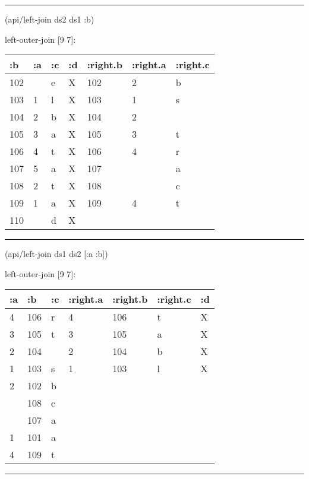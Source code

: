 \documentclass[]{article}
\newenvironment{Shaded}{\begin{snugshade}}{\end{snugshade}}
\newcommand{\AttributeTok}[1]{\textcolor[rgb]{0.77,0.63,0.00}{#1}}
\newcommand{\NormalTok}[1]{#1}
\begin{document}
\begin{center}\rule{0.5\linewidth}{0.5pt}\end{center}

\begin{Shaded}
\begin{Highlighting}[]
\NormalTok{(api/left-join ds2 ds1 }\AttributeTok{:b}\NormalTok{)}
\end{Highlighting}
\end{Shaded}

left-outer-join {[}9 7{]}:

\begin{longtable}[]{@{}lllllll@{}}
\toprule
:b & :a & :c & :d & :right.b & :right.a & :right.c\tabularnewline
\midrule
\endhead
102 & & e & X & 102 & 2 & b\tabularnewline
103 & 1 & l & X & 103 & 1 & s\tabularnewline
104 & 2 & b & X & 104 & 2 &\tabularnewline
105 & 3 & a & X & 105 & 3 & t\tabularnewline
106 & 4 & t & X & 106 & 4 & r\tabularnewline
107 & 5 & a & X & 107 & & a\tabularnewline
108 & 2 & t & X & 108 & & c\tabularnewline
109 & 1 & a & X & 109 & 4 & t\tabularnewline
110 & & d & X & & &\tabularnewline
\bottomrule
\end{longtable}

\begin{center}\rule{0.5\linewidth}{0.5pt}\end{center}

\begin{Shaded}
\begin{Highlighting}[]
\NormalTok{(api/left-join ds1 ds2 [}\AttributeTok{:a} \AttributeTok{:b}\NormalTok{])}
\end{Highlighting}
\end{Shaded}

left-outer-join {[}9 7{]}:

\begin{longtable}[]{@{}lllllll@{}}
\toprule
:a & :b & :c & :right.a & :right.b & :right.c & :d\tabularnewline
\midrule
\endhead
4 & 106 & r & 4 & 106 & t & X\tabularnewline
3 & 105 & t & 3 & 105 & a & X\tabularnewline
2 & 104 & & 2 & 104 & b & X\tabularnewline
1 & 103 & s & 1 & 103 & l & X\tabularnewline
2 & 102 & b & & & &\tabularnewline
& 108 & c & & & &\tabularnewline
& 107 & a & & & &\tabularnewline
1 & 101 & a & & & &\tabularnewline
4 & 109 & t & & & &\tabularnewline
\bottomrule
\end{longtable}

\begin{center}\rule{0.5\linewidth}{0.5pt}\end{center}
\end{document}
